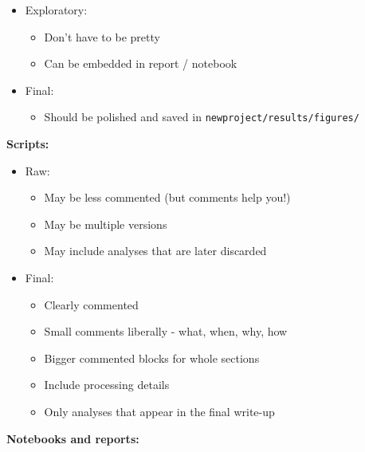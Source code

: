 \documentclass[]{book}
\providecommand{\tightlist}{%
  \setlength{\itemsep}{0pt}\setlength{\parskip}{0pt}}
\begin{document}
\begin{itemize}
\tightlist
\item
  Exploratory:

  \begin{itemize}
  \tightlist
  \item
    Don't have to be pretty
  \item
    Can be embedded in report / notebook
  \end{itemize}
\item
  Final:

  \begin{itemize}
  \tightlist
  \item
    Should be polished and saved in \texttt{newproject/results/figures/}
  \end{itemize}
\end{itemize}

\textbf{Scripts:}

\begin{itemize}
\tightlist
\item
  Raw:

  \begin{itemize}
  \tightlist
  \item
    May be less commented (but comments help you!)
  \item
    May be multiple versions
  \item
    May include analyses that are later discarded
  \end{itemize}
\item
  Final:

  \begin{itemize}
  \tightlist
  \item
    Clearly commented
  \item
    Small comments liberally - what, when, why, how
  \item
    Bigger commented blocks for whole sections
  \item
    Include processing details
  \item
    Only analyses that appear in the final write-up
  \end{itemize}
\end{itemize}

\textbf{Notebooks and reports:}
\end{document}
